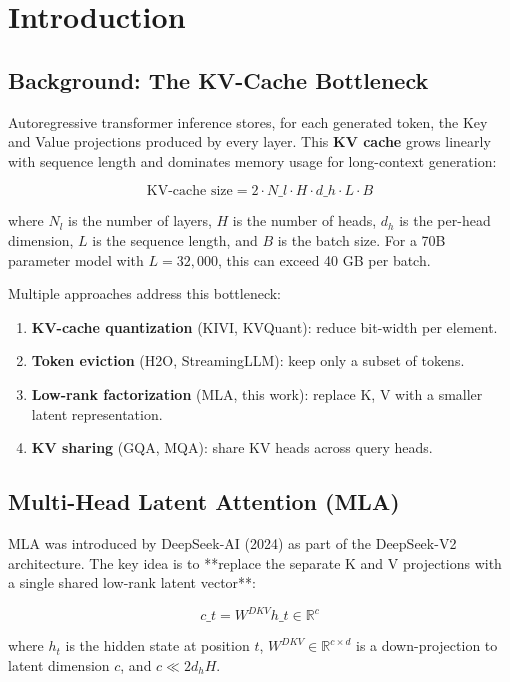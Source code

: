 
\section{Introduction}

\subsection{Background: The KV-Cache Bottleneck}

Autoregressive transformer inference stores, for each generated token, the 
Key and Value projections produced by every layer. This \textbf{KV cache} grows 
linearly with sequence length and dominates memory usage for long-context 
generation:

\[
\text{KV-cache size} = 2 \cdot N\_l \cdot H \cdot d\_h \cdot L \cdot B
\tag{1.1}
\]

where $N_l$ is the number of layers, $H$ is the number of heads, $d_h$ is the 
per-head dimension, $L$ is the sequence length, and $B$ is the batch size. 
For a 70B parameter model with $L = 32{,}000$, this can exceed 40 GB per 
batch.

Multiple approaches address this bottleneck:

\begin{enumerate}
\item \textbf{KV-cache quantization} (KIVI, KVQuant): reduce bit-width per element.
\item \textbf{Token eviction} (H2O, StreamingLLM): keep only a subset of tokens.
\item \textbf{Low-rank factorization} (MLA, this work): replace K, V with a
  smaller latent representation.
\item \textbf{KV sharing} (GQA, MQA): share KV heads across query heads.

\end{enumerate}
\subsection{Multi-Head Latent Attention (MLA)}

MLA was introduced by DeepSeek-AI (2024) as part of the DeepSeek-V2 
architecture. The key idea is to **replace the separate K and V projections 
with a single shared low-rank latent vector**:

\[
c\_t = W^{DKV} h\_t \in \mathbb{R}^{c}
\tag{1.2}
\]

where $h_t$ is the hidden state at position $t$, $W^{DKV} \in \mathbb{R}^{c \times d}$ 
is a down-projection to latent dimension $c$, and $c \ll 2 d_h H$.

